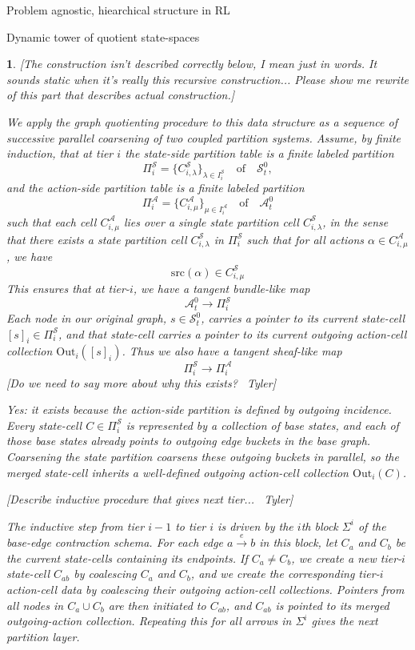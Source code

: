 \documentclass[11pt]{article}
\newtheorem{ermark}[subsubsection]{}
\begin{document}
\begin{section}{Problem agnostic, hiearchical structure in RL}
\begin{subsection}{Dynamic tower of quotient state-spaces}
\begin{ermark}
{\color{blue} [The construction isn't described correctly  below, I mean just in words. It sounds static when it's really this recursive construction... Please show me rewrite of this part that describes actual construction.]}

We apply the graph quotienting procedure to this data structure as a sequence of successive parallel coarsening of two coupled partition systems. Assume, by finite induction, that at tier $i$ the \emph{state-side partition table} is a finite labeled partition
\[
\Pi_i^{\mathcal S}=\{C_{i,\lambda}^{\mathcal S}\}_{\lambda\in I_i^{\mathcal S}}
\quad\text{of}\quad\mathcal{S}_t^0,
\]
and the \emph{action-side partition table} is a finite labeled partition
\[
\Pi_i^{\mathcal A}=\{C_{i,\mu}^{\mathcal A}\}_{\mu\in I_i^{\mathcal A}}
\quad\text{of}\quad\mathcal{A}_t^0
\]
such that each cell $C_{i,\mu}^{\mathcal A}$ lies over a single state partition cell $C_{i,\lambda}^{\mathcal S}$, in the sense that there exists a state partition cell $C_{i,\lambda}^{\mathcal S}$ in $\Pi_i^{\mathcal S}$ such that for all actions $\alpha\in C_{i,\mu}^{\mathcal A}$, we have
	$$
	\text{src}(\alpha)\in C_{i,\mu}^{\mathcal S}
	$$
This ensures that at tier-$i$, we have a tangent bundle-like map 
$$
\mathcal{A}^{0}_{t}\longrightarrow\Pi_i^{\mathcal S}
$$
Each node in our original graph, $s\in\mathcal{S}_t^0$, carries a pointer to its current state-cell $[s]_i\in\Pi_i^{\mathcal S}$, and that state-cell carries a pointer to its current outgoing action-cell collection $\mathrm{Out}_i([s]_i)$. Thus we also have a tangent sheaf-like map
$$
\Pi_i^{\mathcal S}\longrightarrow\Pi_i^{\mathcal A}
$$
{\color{blue} [Do we need to say more about why this exists? \textemdash\ Tyler]}

{\color{green} Yes: it exists because the action-side partition is defined by outgoing incidence. Every state-cell $C\in\Pi_i^{\mathcal S}$ is represented by a collection of base states, and each of those base states already points to outgoing edge buckets in the base graph. Coarsening the state partition coarsens these outgoing buckets in parallel, so the merged state-cell inherits a well-defined outgoing action-cell collection $\mathrm{Out}_i(C)$.}

{\color{blue} [Describe inductive procedure that gives next tier... \textemdash\ Tyler]}

{\color{green} The inductive step from tier $i-1$ to tier $i$ is driven by the $i$th block $\Sigma^i$ of the base-edge contraction schema. For each edge $a\xrightarrow{\ e\ }b$ in this block, let $C_a$ and $C_b$ be the current state-cells containing its endpoints. If $C_a\neq C_b$, we create a new tier-$i$ state-cell $C_{ab}$ by coalescing $C_a$ and $C_b$, and we create the corresponding tier-$i$ action-cell data by coalescing their outgoing action-cell collections. Pointers from all nodes in $C_a\cup C_b$ are then initiated to $C_{ab}$, and $C_{ab}$ is pointed to its merged outgoing-action collection. Repeating this for all arrows in $\Sigma^i$ gives the next partition layer.}


\end{ermark}
\end{subsection}
\end{section}
\end{document}
